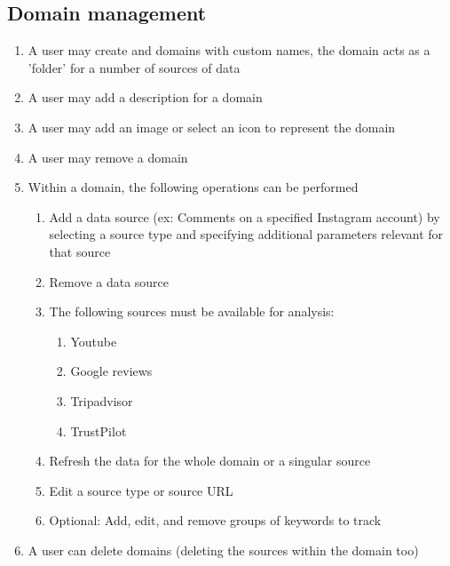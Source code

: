 \documentclass[12pt]{article}
\begin{document}
\subsection{Domain management}
\begin{enumerate}
  \item A user may create and domains with custom names, the domain acts as a 'folder' for a number of sources of data
  \item A user may add a description for a domain
  \item A user may add an image or select an icon to represent the domain
  \item A user may remove a domain
  \item Within a domain, the following operations can be performed
        \begin{enumerate}
          \item Add a data source (ex: Comments on a specified Instagram account) by selecting a source type and specifying additional parameters relevant for that source
          \item Remove a data source
          \item The following sources must be available for analysis:
                \begin{enumerate}
                  \item Youtube
                  \item Google reviews
                  \item Tripadvisor
                  \item TrustPilot
                \end{enumerate}
          \item Refresh the data for the whole domain or a singular source
          \item Edit a source type or source URL
          \item Optional: Add, edit, and remove groups of keywords to track
        \end{enumerate}
  \item A user can delete domains (deleting the sources within the domain too)
\end{enumerate}
\end{document}
